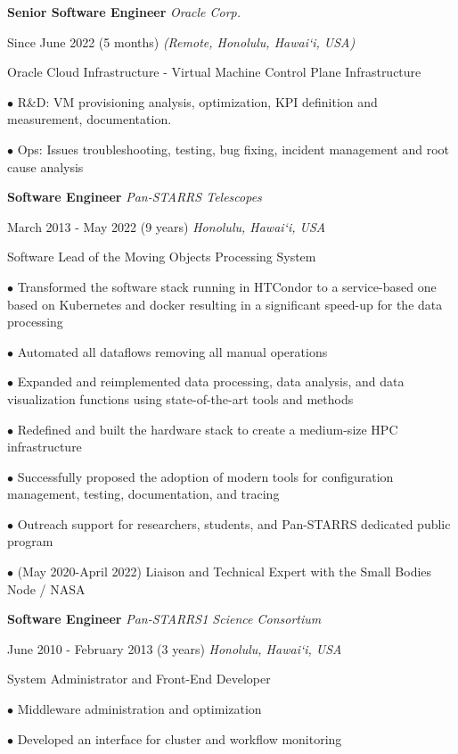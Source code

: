 \documentclass[12pt]{article}
\newcommand{\mynewsection}[2]{%
  \medskip

  \textbf{\color{colorsection}\LARGE {#1}\hspace{0.25in}{#2}}
}
\newcommand{\experience}[4]{%
  \medskip
  {\color{colorsection}\textbf{\large #1}}
  \hfill
  \textit{\small #2}

  {\small #3}
  \hfill    
  \textit{\small #4}}
\begin{document}
\begin{minipage}[t]{0.67\linewidth}
  \mynewsection{\faBriefcase}{Experience}
  
  \experience{Senior Software Engineer}{Oracle Corp.}{Since June 2022 (5
    months)}{(Remote, Honolulu, Hawai`i, USA)}

  \medskip
  
  {\large Oracle Cloud Infrastructure - Virtual Machine Control Plane
    Infrastructure}

  $\bullet$ R\&D: VM provisioning analysis, optimization, KPI
  definition and measurement, documentation.

  $\bullet$ Ops: Issues troubleshooting, testing, bug fixing, incident
  management and root cause analysis
  
  \medskip

  \experience{Software Engineer}{Pan-STARRS Telescopes}{March
    2013 - May 2022 (9 years)}{Honolulu, Hawai`i, USA}

  \medskip
  
  {\large Software Lead of the Moving Objects Processing System}
  
  $\bullet$ Transformed the software stack running in HTCondor to a
  service-based one based on Kubernetes and docker resulting in a
  significant speed-up for the data processing
  
  $\bullet$ Automated all dataflows removing all manual
  operations

  $\bullet$ Expanded and reimplemented data processing, data analysis,
  and data visualization functions using state-of-the-art tools and
  methods

  $\bullet$ Redefined and built the hardware stack to create a
  medium-size HPC infrastructure

  $\bullet$ Successfully proposed the adoption of modern tools for
  configuration management, testing, documentation, and tracing

  $\bullet$ Outreach support for researchers, students, and Pan-STARRS
  dedicated public program

  $\bullet$ (May 2020-April 2022) Liaison and Technical Expert with
  the Small Bodies Node / NASA
  
  \experience{Software Engineer}{Pan-STARRS1 Science Consortium}{June
    2010 - February 2013 (3 years)}{Honolulu, Hawai`i, USA}

  \medskip

  {\large System Administrator and Front-End Developer}
  
  $\bullet$ Middleware administration and optimization
  
  $\bullet$ Developed an interface for cluster and workflow monitoring
\end{minipage}
\end{document}
